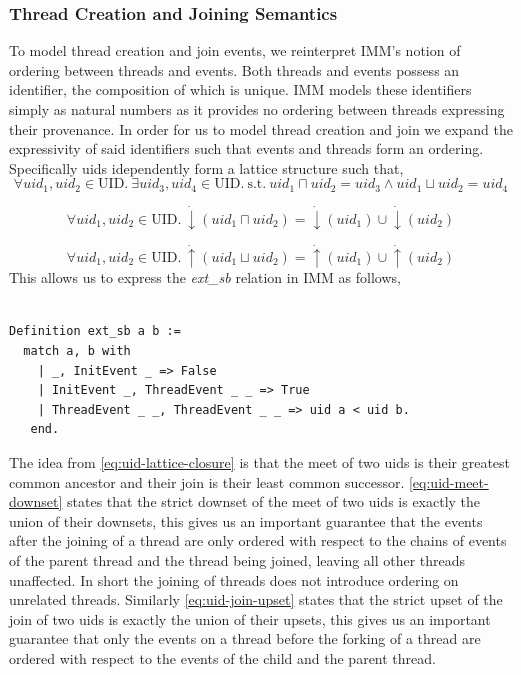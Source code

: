 \subsubsection{Thread Creation and Joining Semantics}
To model thread creation and join events, we reinterpret IMM's notion of ordering between threads and events. Both threads and events possess an identifier, the composition of which is unique. IMM models these identifiers simply as 
natural numbers as it provides no ordering between threads expressing their provenance. In order for us to model thread creation and join we expand the expressivity of said identifiers such that events and threads form an ordering. 
Specifically uids idependently form a lattice structure such that, 
\begin{equation}
    \label{eq:uid-lattice-closure}
    \forall uid_1, uid_2 \in \text{UID}. \: \exists uid_3, uid_4 \in \text{UID}. \: \text{s.t.} \: uid_1 \sqcap uid_2 = uid_3 \wedge uid_1 \sqcup uid_2 = uid_4
\end{equation}
 
\begin{equation}
    \label{eq:uid-meet-downset}
    \forall uid_1, uid_2 \in \text{UID}. \: \dot{\downarrow}  (uid_1 \sqcap uid_2) = \dot{\downarrow} (uid_1) \cup \dot{\downarrow} (uid_2)  
\end{equation}

\begin{equation}
    \label{eq:uid-join-upset}
    \forall uid_1, uid_2 \in \text{UID}. \: \dot{\uparrow}  (uid_1 \sqcup uid_2) = \dot{\uparrow} (uid_1) \cup \dot{\uparrow} (uid_2)
\end{equation}
This allows us to express the \textit{ext\_sb} relation in IMM as follows, 

\begin{verbatim}

Definition ext_sb a b := 
  match a, b with 
    | _, InitEvent _ => False
    | InitEvent _, ThreadEvent _ _ => True
    | ThreadEvent _ _, ThreadEvent _ _ => uid a < uid b. 
   end.

\end{verbatim}

The idea from \ref{eq:uid-lattice-closure} is that the meet of two uids is their greatest common ancestor and their join is their least common successor. 
\ref{eq:uid-meet-downset} states that the strict downset of the meet of two uids is exactly the union of their downsets, this gives us an important guarantee that the events after the joining of a thread are only ordered with respect to the chains of 
events of the parent thread and the thread being joined, leaving all other threads unaffected. In short the joining of threads does not introduce ordering on unrelated threads. 
Similarly \ref{eq:uid-join-upset} states that the strict upset of the join of two uids is exactly the union of their upsets, this gives us an important guarantee that only the events on a thread before the forking of a thread are ordered with respect to the events of the child and the parent thread. 

